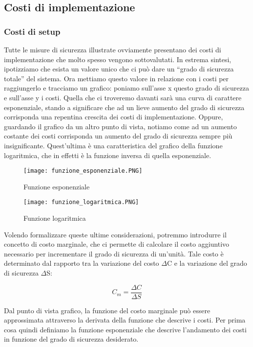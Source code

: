 \documentclass[12pt]{article}
\begin{document}
\bigskip
\subsection{Costi di implementazione}
\subsubsection{Costi di setup}
Tutte le misure di sicurezza illustrate ovviamente presentano dei costi di implementazione che molto spesso vengono sottovalutati. 
In estrema sintesi, ipotizziamo che esista un valore unico che ci può dare un “grado di sicurezza totale” del sistema. Ora mettiamo questo valore in relazione con i costi per raggiungerlo e tracciamo un grafico: poniamo sull’asse x questo grado di sicurezza e sull’asse y i costi.
Quella che ci troveremo davanti sarà una curva di carattere esponenziale, stando a significare che ad un lieve aumento del grado di sicurezza corrisponda una repentina crescita dei costi di implementazione. Oppure, guardando il grafico da un altro punto di vista, notiamo come ad un aumento costante dei costi corrisponda un aumento del grado di sicurezza sempre più insignificante. Quest’ultima è una caratteristica del grafico della funzione logaritmica, che in effetti è la funzione inversa di quella esponenziale.


\begin{figure}[!htb]
   \begin{minipage}{0.48\textwidth}
     \centering
     \texttt{[image: funzione\_esponenziale.PNG]}
     \caption{Funzione esponenziale}\label{Fig:Data1}
   \end{minipage}\hfill
   \begin{minipage}{0.48\textwidth}
     \centering
     \texttt{[image: funzione\_logaritmica.PNG]}
     \caption{Funzione logaritmica}\label{Fig:Data2}
   \end{minipage}
\end{figure}


Volendo formalizzare queste ultime considerazioni, potremmo introdurre il concetto di costo marginale, che ci permette di calcolare il costo aggiuntivo necessario per incrementare il grado di sicurezza di un'unità.
Tale costo è determinato dal rapporto tra la variazione del costo $\Delta$C e la variazione del grado di sicurezza $\Delta$S:

\[C_m=\frac{\Delta C}{\Delta S}\]

Dal punto di vista grafico, la funzione del costo marginale può essere approssimata attraverso la derivata della funzione che descrive i costi.
Per prima cosa quindi definiamo la funzione esponenziale che descrive l’andamento dei costi in funzione del grado di sicurezza desiderato.
\end{document}
